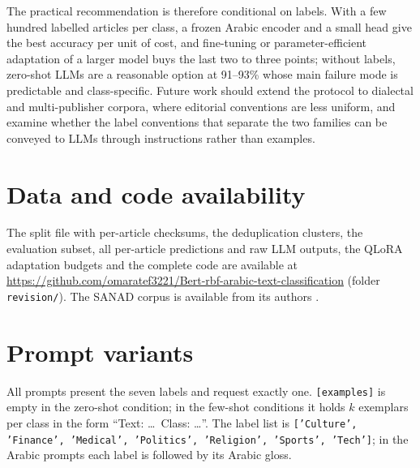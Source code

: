 \documentclass[preprint,12pt,authoryear]{elsarticle}
\newif\ifrevmarkup
\DeclareRobustCommand{\rev}[1]{\ifrevmarkup{\color{blue}#1}\else#1\fi}
\begin{document}
The practical recommendation is therefore conditional on labels. With a few hundred labelled articles per class, a frozen Arabic encoder and a small head give the best accuracy per unit of cost, and fine-tuning or parameter-efficient adaptation of a larger model buys the last two to three points; without labels, zero-shot LLMs are a reasonable option at 91--93\% whose main failure mode is predictable and class-specific. Future work should extend the protocol to dialectal and multi-publisher corpora, where editorial conventions are less uniform, and examine whether the label conventions that separate the two families can be conveyed to LLMs through instructions rather than examples.

\section*{\rev{Data and code availability}}
\rev{The split file with per-article checksums, the deduplication clusters, the evaluation subset, all per-article predictions and raw LLM outputs, the QLoRA adaptation budgets and the complete code are available at \url{https://github.com/omaratef3221/Bert-rbf-arabic-text-classification} (folder \texttt{revision/}). The SANAD corpus is available from its authors \cite{elnagar2020arabic}.}

\appendix
\setcounter{table}{0}
\section{\rev{Prompt variants}}
\label{app:prompts}

\rev{All prompts present the seven labels and request exactly one. \texttt{[examples]} is empty in the zero-shot condition; in the few-shot conditions it holds $k$ exemplars per class in the form ``Text: \ldots\ Class: \ldots''. The label list is \texttt{['Culture', 'Finance', 'Medical', 'Politics', 'Religion', 'Sports', 'Tech']}; in the Arabic prompts each label is followed by its Arabic gloss.}
\end{document}
